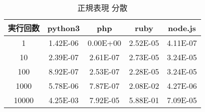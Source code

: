 \begin{table}[tb]
\centering
\begin{tabular}{|c||c|c|c|c|}
\hline
実行回数	&python3	&php	&ruby	&node.js\\ \hline
1	&1.42E-06	&0.00E+00	&2.52E-05	&4.11E-07\\ \hline
10	&2.39E-07	&2.61E-07	&2.73E-05	&3.24E-05\\ \hline
100	&8.92E-07	&2.53E-07	&2.28E-05	&3.24E-05\\ \hline
1000	&5.78E-06	&7.87E-07	&2.08E-02	&4.27E-06\\ \hline
10000	&4.25E-03	&7.92E-05	&5.88E-01	&7.09E-05\\ \hline
\end{tabular}
\caption{正規表現 分散}
\label{table:s-dispersion}
\end{table}